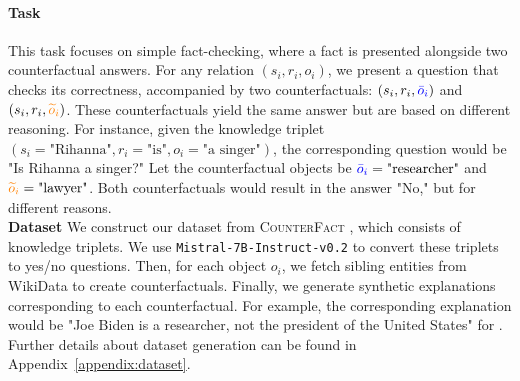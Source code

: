 \paragraph{Task} This task focuses on simple fact-checking, where a fact is presented alongside two counterfactual answers. For any relation $(s_i, r_i, o_i)$, we present a question that checks its correctness, accompanied by two counterfactuals: $(s_i, r_i, \bobject{i})$ and $(s_i, r_i, \oobject{i})$. These counterfactuals yield the same answer but are based on different reasoning. For instance, given the knowledge triplet $(s_i = \text{"Rihanna"}, r_i = \text{"is"}, o_i = \text{"a singer"})$, the corresponding question would be "Is Rihanna a singer?" Let the counterfactual objects be $\bobject{i} = \text{"researcher"}$ and $\oobject{i} = \text{"lawyer"}$. Both counterfactuals would result in the answer "No," but for different reasons.\\
\noindent \textbf{Dataset} We construct our dataset from \textsc{CounterFact}  \citep{Meng2022LocatingAE}, which consists of knowledge triplets. We use \texttt{Mistral-7B-Instruct-v0.2} to convert these triplets to yes/no questions. Then, for each object $o_i$, we fetch sibling entities from WikiData to create counterfactuals. Finally, we generate synthetic explanations corresponding to each counterfactual. For example, the corresponding explanation  would be "Joe Biden is a researcher, not the president of the United States" for .  Further details about dataset generation can be found in Appendix~\ref{appendix:dataset}.
